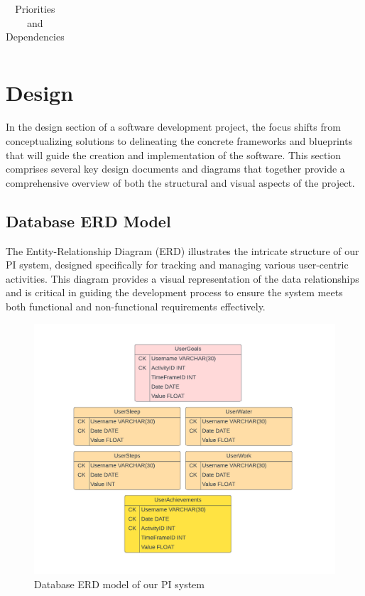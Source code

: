 \documentclass[12pt]{article}
\begin{document}
\begin{table}[!ht]
\begin{center}
\begin{tabular}{|l|c|c|c|}
\end{tabular}
\caption{Priorities and Dependencies}
\label{tab:priorities_dependencies}
\end{center}
\end{table}


\newpage
\section{Design}

In the design section of a software development project, the focus shifts from
conceptualizing solutions to delineating the concrete frameworks and blueprints
that will guide the creation and implementation of the software. This section 
comprises several key design documents and diagrams that together provide a 
comprehensive overview of both the structural and visual aspects of the project.\par

\subsection{Database ERD Model}

The Entity-Relationship Diagram (ERD) illustrates the intricate structure of
our PI system, designed specifically for tracking and managing various
user-centric activities. This diagram provides a visual representation of the
data relationships and is critical in guiding the development process to ensure
the system meets both functional and non-functional requirements
effectively.\par


\begin{figure}[!ht]
  \centering
  \includegraphics[width = 0.7\linewidth]{PI Systems Database}
  \caption{Database ERD model of our PI system}
  \label{fig:PI_ERD}
\end{figure}
\end{document}
